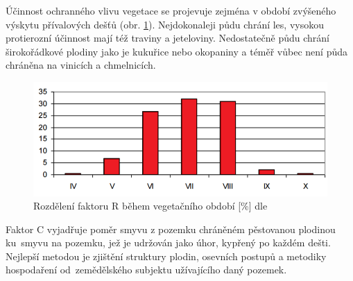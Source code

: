 Účinnost ochranného vlivu vegetace se projevuje zejména v období zvýšeného výskytu přívalových dešťů (obr. \ref{fig:r_faktor_graph}). Nejdokonaleji půdu chrání les, vysokou protierozní účinnost mají též traviny a jeteloviny. Nedostatečně půdu chrání širokořádkové plodiny jako je kukuřice nebo okopaniny a téměř vůbec není půda chráněna na vinicích a chmelnicích.
\vspace{-10pt}
\begin{figure}[H]
    \centering
      \includegraphics[scale=0.6]{./pictures/r_factor_graph.png}
      \caption[Rozdělení faktoru R během vegetačního období]{Rozdělení faktoru R během vegetačního období [\%] dle \cite{janecek2012}}
      \label{fig:r_faktor_graph}
\end{figure}
\vspace{-16pt}
Faktor C vyjadřuje poměr smyvu z pozemku chráněném pěstovanou plodinou ku~smyvu na pozemku, jež je udržován jako úhor, kypřený po každém dešti. Nejlepší metodou je zjištění struktury plodin, osevních postupů a metodiky hospodaření od~zemědělského subjektu užívajícího daný pozemek. 

